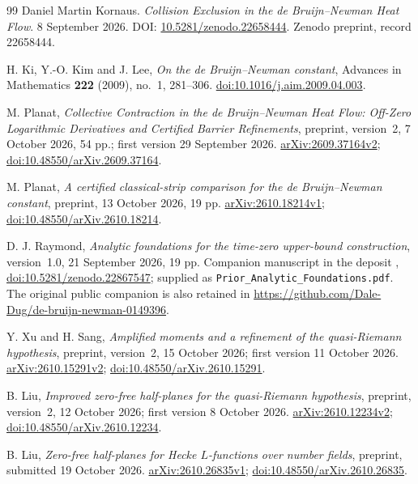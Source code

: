 \documentclass[11pt,a4paper]{article}
\theoremstyle{definition}
\theoremstyle{remark}
\begin{document}
\begin{thebibliography}{99}
Daniel Martin Kornaus. \emph{Collision Exclusion in the de Bruijn--Newman Heat Flow}.
8 September 2026.
DOI: \href{https://doi.org/10.5281/zenodo.22658444}{10.5281/zenodo.22658444}.
Zenodo preprint, record 22658444.

H. Ki, Y.-O. Kim and J. Lee,
\emph{On the de Bruijn--Newman constant},
Advances in Mathematics \textbf{222} (2009), no.~1, 281--306.
\href{https://doi.org/10.1016/j.aim.2009.04.003}{doi:10.1016/j.aim.2009.04.003}.

M. Planat, \emph{Collective Contraction in the de Bruijn--Newman Heat Flow:
Off-Zero Logarithmic Derivatives and Certified Barrier Refinements},
preprint, version~2, 7 October 2026, 54 pp.; first version 29 September 2026.
\href{https://arxiv.org/abs/2609.37164v2}{arXiv:2609.37164v2};
\href{https://doi.org/10.48550/arXiv.2609.37164}{doi:10.48550/arXiv.2609.37164}.

M. Planat, \emph{A certified classical-strip comparison for the
de Bruijn--Newman constant}, preprint, 13 October 2026, 19 pp.
\href{https://arxiv.org/abs/2610.18214v1}{arXiv:2610.18214v1};
\href{https://doi.org/10.48550/arXiv.2610.18214}{doi:10.48550/arXiv.2610.18214}.

D. J. Raymond, \emph{Analytic foundations for the time-zero upper-bound
construction}, version~1.0, 21 September 2026, 19 pp.
Companion manuscript in the deposit \cite{RaymondCorrelated},
\href{https://doi.org/10.5281/zenodo.22867547}{doi:10.5281/zenodo.22867547};
supplied as \nolinkurl{Prior_Analytic_Foundations.pdf}.
The original public companion is also retained in
\url{https://github.com/Dale-Dug/de-bruijn-newman-0149396}.

Y. Xu and H. Sang, \emph{Amplified moments and a refinement of the
quasi-Riemann hypothesis}, preprint, version~2, 15 October 2026;
first version 11 October 2026.
\href{https://arxiv.org/abs/2610.15291v2}{arXiv:2610.15291v2};
\href{https://doi.org/10.48550/arXiv.2610.15291}{doi:10.48550/arXiv.2610.15291}.

B. Liu, \emph{Improved zero-free half-planes for the quasi-Riemann
hypothesis}, preprint, version~2, 12 October 2026;
first version 8 October 2026.
\href{https://arxiv.org/abs/2610.12234v2}{arXiv:2610.12234v2};
\href{https://doi.org/10.48550/arXiv.2610.12234}{doi:10.48550/arXiv.2610.12234}.

B. Liu, \emph{Zero-free half-planes for Hecke $L$-functions over number
fields}, preprint, submitted 19 October 2026.
\href{https://arxiv.org/abs/2610.26835v1}{arXiv:2610.26835v1};
\href{https://doi.org/10.48550/arXiv.2610.26835}{doi:10.48550/arXiv.2610.26835}.


\end{thebibliography}
\end{document}
